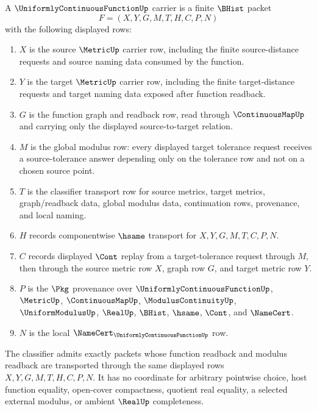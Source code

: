 \begin{definition}
\label{def:uniformly-continuous-function-carrier}
A $\UniformlyContinuousFunctionUp$ carrier is a finite $\BHist$ packet
$$
F=(X,Y,G,M,T,H,C,P,N)
$$
with the following displayed rows:
\begin{enumerate}
\item $X$ is the source $\MetricUp$ carrier row, including the finite source-distance requests and source naming data consumed by the function.
\item $Y$ is the target $\MetricUp$ carrier row, including the finite target-distance requests and target naming data exposed after function readback.
\item $G$ is the function graph and readback row, read through $\ContinuousMapUp$ and carrying only the displayed source-to-target relation.
\item $M$ is the global modulus row: every displayed target tolerance request receives a source-tolerance answer depending only on the tolerance row and not on a chosen source point.
\item $T$ is the classifier transport row for source metrics, target metrics, graph/readback data, global modulus data, continuation rows, provenance, and local naming.
\item $H$ records componentwise $\hsame$ transport for $X,Y,G,M,T,C,P,N$.
\item $C$ records displayed $\Cont$ replay from a target-tolerance request through $M$, then through the source metric row $X$, graph row $G$, and target metric row $Y$.
\item $P$ is the $\Pkg$ provenance over $\UniformlyContinuousFunctionUp$, $\MetricUp$, $\ContinuousMapUp$, $\ModulusContinuityUp$, $\UniformModulusUp$, $\RealUp$, $\BHist$, $\hsame$, $\Cont$, and $\NameCert$.
\item $N$ is the local $\NameCert_{\UniformlyContinuousFunctionUp}$ row.
\end{enumerate}
The classifier admits exactly packets whose function readback and modulus readback are transported through the same displayed rows $X,Y,G,M,T,H,C,P,N$. It has no coordinate for arbitrary pointwise choice, host function equality, open-cover compactness, quotient real equality, a selected external modulus, or ambient $\RealUp$ completeness.
\end{definition}

